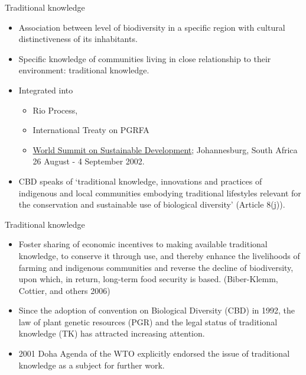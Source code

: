\documentclass[ignorenonframetext,aspectratio=169]{beamer}
\providecommand{\tightlist}{%
  \setlength{\itemsep}{0pt}\setlength{\parskip}{0pt}}
\begin{document}
\begin{frame}{Traditional knowledge}
\protect\hypertarget{traditional-knowledge}{}

\begin{itemize}
\tightlist
\item
  Association between level of biodiversity in a specific region with
  cultural distinctiveness of its inhabitants.
\item
  Specific knowledge of communities living in close relationship to
  their environment: traditional knowledge.
\item
  Integrated into

  \begin{itemize}
  \tightlist
  \item
    Rio Process,
  \item
    International Treaty on PGRFA
  \item
    \href{https://sustainabledevelopment.un.org/milesstones/wssd}{World
    Summit on Sustainable Development}; Johannesburg, South Africa 26
    August - 4 September 2002.
  \end{itemize}
\item
  CBD speaks of `traditional knowledge, innovations and practices of
  indigenous and local communities embodying traditional lifestyles
  relevant for the conservation and sustainable use of biological
  diversity' (Article 8(j)).
\end{itemize}

\end{frame}

\begin{frame}{Traditional knowledge}
\protect\hypertarget{traditional-knowledge-1}{}

\begin{itemize}
\tightlist
\item
  Foster sharing of economic incentives to making available traditional
  knowledge, to conserve it through use, and thereby enhance the
  livelihoods of farming and indigenous communities and reverse the
  decline of biodiversity, upon which, in return, long-term food
  security is based. (Biber-Klemm, Cottier, and others 2006)
\item
  Since the adoption of convention on Biological Diversity (CBD) in
  1992, the law of plant genetic resources (PGR) and the legal status of
  traditional knowledge (TK) has attracted increasing attention.
\item
  2001 Doha Agenda of the WTO explicitly endorsed the issue of
  traditional knowledge as a subject for further work.
\end{itemize}

\end{frame}
\end{document}
